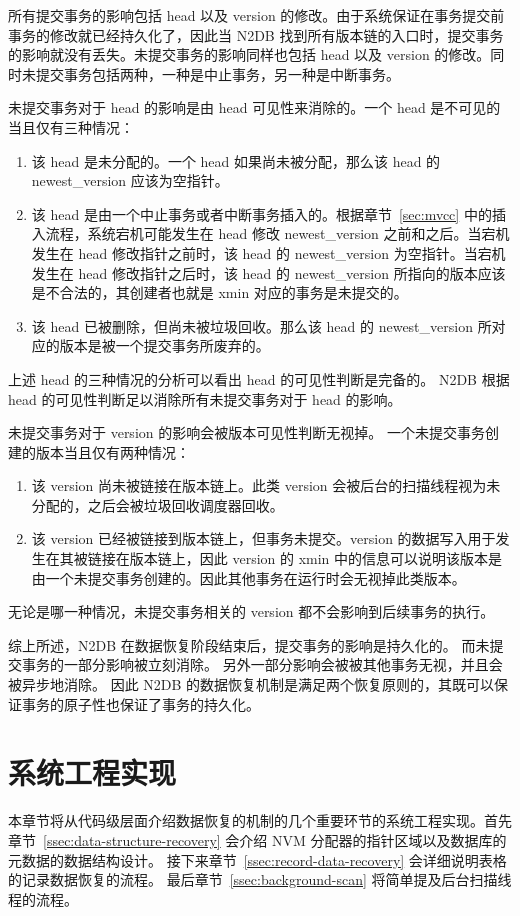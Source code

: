 所有提交事务的影响包括 head 以及 version 的修改。由于系统保证在事务提交前事务的修改就已经持久化了，因此当 N2DB 找到所有版本链的入口时，提交事务的影响就没有丢失。未提交事务的影响同样也包括 head 以及 version 的修改。同时未提交事务包括两种，一种是中止事务，另一种是中断事务。

未提交事务对于 head 的影响是由 head 可见性来消除的。一个 head 是不可见的当且仅有三种情况：
\begin{enumerate}
    \item 该 head 是未分配的。一个 head 如果尚未被分配，那么该 head 的 newest\_version 应该为空指针。
    \item 该 head 是由一个中止事务或者中断事务插入的。根据章节~\ref{sec:mvcc} 中的插入流程，系统宕机可能发生在 head 修改 newest\_version 之前和之后。当宕机发生在 head 修改指针之前时，该 head 的 newest\_version 为空指针。当宕机发生在 head 修改指针之后时，该 head 的 newest\_version 所指向的版本应该是不合法的，其创建者也就是 xmin 对应的事务是未提交的。
    \item 该 head 已被删除，但尚未被垃圾回收。那么该 head 的 newest\_version 所对应的版本是被一个提交事务所废弃的。
\end{enumerate}
上述 head 的三种情况的分析可以看出 head 的可见性判断是完备的。
N2DB 根据 head 的可见性判断足以消除所有未提交事务对于 head 的影响。

未提交事务对于 version 的影响会被版本可见性判断无视掉。
一个未提交事务创建的版本当且仅有两种情况：
\begin{enumerate}
    \item 该 version 尚未被链接在版本链上。此类 version 会被后台的扫描线程视为未分配的，之后会被垃圾回收调度器回收。
    \item 该 version 已经被链接到版本链上，但事务未提交。version 的数据写入用于发生在其被链接在版本链上，因此 version 的 xmin 中的信息可以说明该版本是由一个未提交事务创建的。因此其他事务在运行时会无视掉此类版本。
\end{enumerate}
无论是哪一种情况，未提交事务相关的 version 都不会影响到后续事务的执行。

综上所述，N2DB 在数据恢复阶段结束后，提交事务的影响是持久化的。
而未提交事务的一部分影响被立刻消除。
另外一部分影响会被被其他事务无视，并且会被异步地消除。
因此 N2DB 的数据恢复机制是满足两个恢复原则的，其既可以保证事务的原子性也保证了事务的持久化。

\section{系统工程实现}
本章节将从代码级层面介绍数据恢复的机制的几个重要环节的系统工程实现。首先章节~\ref{ssec:data-structure-recovery} 会介绍 NVM 分配器的指针区域以及数据库的元数据的数据结构设计。
接下来章节~\ref{ssec:record-data-recovery} 会详细说明表格的记录数据恢复的流程。
最后章节~\ref{ssec:background-scan} 将简单提及后台扫描线程的流程。

